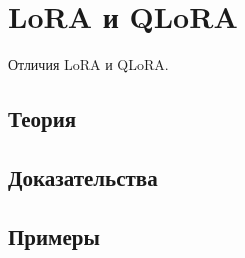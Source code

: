 
\section{LoRA и QLoRA}
\label{sec:2.5.09-lora-qlora}

\begin{ticket}
Отличия LoRA и QLoRA.
\end{ticket}

\subsection*{Теория}

\subsection*{Доказательства}

\subsection*{Примеры}
